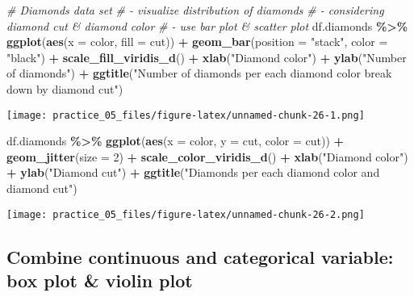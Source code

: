 \documentclass[
]{article}
\newenvironment{Shaded}{\begin{snugshade}}{\end{snugshade}}
\newcommand{\AttributeTok}[1]{\textcolor[rgb]{0.13,0.29,0.53}{#1}}
\newcommand{\CommentTok}[1]{\textcolor[rgb]{0.56,0.35,0.01}{\textit{#1}}}
\newcommand{\DecValTok}[1]{\textcolor[rgb]{0.00,0.00,0.81}{#1}}
\newcommand{\FunctionTok}[1]{\textcolor[rgb]{0.13,0.29,0.53}{\textbf{#1}}}
\newcommand{\NormalTok}[1]{#1}
\newcommand{\SpecialCharTok}[1]{\textcolor[rgb]{0.81,0.36,0.00}{\textbf{#1}}}
\newcommand{\StringTok}[1]{\textcolor[rgb]{0.31,0.60,0.02}{#1}}
\begin{document}
\begin{Shaded}
\begin{Highlighting}[]
\CommentTok{\# Diamonds data set}
\CommentTok{\# {-} visualize distribution of diamonds}
\CommentTok{\# {-} considering diamond cut \& diamond color}
\CommentTok{\# {-} use bar plot \& scatter plot}
\NormalTok{df.diamonds }\SpecialCharTok{\%\textgreater{}\%} 
  \FunctionTok{ggplot}\NormalTok{(}\FunctionTok{aes}\NormalTok{(}\AttributeTok{x =}\NormalTok{ color,}
             \AttributeTok{fill =}\NormalTok{ cut)) }\SpecialCharTok{+}
  \FunctionTok{geom\_bar}\NormalTok{(}\AttributeTok{position =} \StringTok{"stack"}\NormalTok{,}
           \AttributeTok{color =} \StringTok{"black"}\NormalTok{) }\SpecialCharTok{+}  
  \FunctionTok{scale\_fill\_viridis\_d}\NormalTok{() }\SpecialCharTok{+}
  \FunctionTok{xlab}\NormalTok{(}\StringTok{"Diamond color"}\NormalTok{) }\SpecialCharTok{+}
  \FunctionTok{ylab}\NormalTok{(}\StringTok{"Number of diamonds"}\NormalTok{) }\SpecialCharTok{+}
  \FunctionTok{ggtitle}\NormalTok{(}\StringTok{"Number of diamonds per each diamond color break down by diamond cut"}\NormalTok{)}
\end{Highlighting}
\end{Shaded}

\texttt{[image: practice\_05\_files/figure-latex/unnamed-chunk-26-1.png]}

\begin{Shaded}
\begin{Highlighting}[]
\NormalTok{df.diamonds }\SpecialCharTok{\%\textgreater{}\%} 
  \FunctionTok{ggplot}\NormalTok{(}\FunctionTok{aes}\NormalTok{(}\AttributeTok{x =}\NormalTok{ color,}
             \AttributeTok{y =}\NormalTok{ cut,}
             \AttributeTok{color =}\NormalTok{ cut)) }\SpecialCharTok{+}
  \FunctionTok{geom\_jitter}\NormalTok{(}\AttributeTok{size =} \DecValTok{2}\NormalTok{) }\SpecialCharTok{+}  
  \FunctionTok{scale\_color\_viridis\_d}\NormalTok{() }\SpecialCharTok{+}
  \FunctionTok{xlab}\NormalTok{(}\StringTok{"Diamond color"}\NormalTok{) }\SpecialCharTok{+}
  \FunctionTok{ylab}\NormalTok{(}\StringTok{"Diamond cut"}\NormalTok{) }\SpecialCharTok{+}
  \FunctionTok{ggtitle}\NormalTok{(}\StringTok{"Diamonds per each diamond color and diamond cut"}\NormalTok{)}
\end{Highlighting}
\end{Shaded}

\texttt{[image: practice\_05\_files/figure-latex/unnamed-chunk-26-2.png]}

\subsection{Combine continuous and categorical variable: box plot \&
violin
plot}\label{combine-continuous-and-categorical-variable-box-plot-violin-plot}
\end{document}
